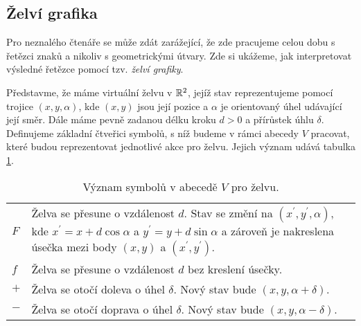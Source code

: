 \subsection{Želví grafika}\label{subsec:zelvi-grafika}

Pro neznalého čtenáře se může zdát zarážející, že zde pracujeme celou dobu s řetězci znaků a nikoliv s geometrickými útvary. Zde si ukážeme, jak interpretovat výsledné řetězce pomocí tzv. \emph{želví grafiky}.

Představme, že máme virtuální želvu v $\mathbb{R}^2$, jejíž stav reprezentujeme pomocí trojice $(x,y,\alpha)$, kde $(x,y)$ jsou její pozice a $\alpha$ je orientovaný úhel udávající její směr. Dále máme pevně zadanou délku kroku $d>0$ a přírůstek úhlu $\delta$. Definujeme základní čtveřici symbolů, s níž budeme v rámci abecedy $V$ pracovat, které budou reprezentovat jednotlivé akce pro želvu. Jejich význam udává tabulka \ref{table:vyznam-symbolu-zelva}.
\begin{table}[h]
    \centering
    \begin{tabular}{lp{}}
        $F$ & Želva se přesune o vzdálenost $d$. Stav se změní na $(x^\prime,y^\prime,\alpha)$, kde $x^\prime=x+d\cos\alpha$ a $y^\prime=y+d\sin\alpha$ a zároveň je nakreslena úsečka mezi body $(x,y)$ a $(x^\prime,y^\prime)$.\\
        $f$ & Želva se přesune o vzdálenost $d$ bez kreslení úsečky.\\
        $+$ & Želva se otočí doleva o úhel $\delta$. Nový stav bude $(x,y,\alpha+\delta)$.\\
        $-$ & Želva se otočí doprava o úhel $\delta$. Nový stav bude $(x,y,\alpha-\delta)$.
    \end{tabular}
    \caption{Význam symbolů v abecedě $V$ pro želvu.}
    \label{table:vyznam-symbolu-zelva}
\end{table}

